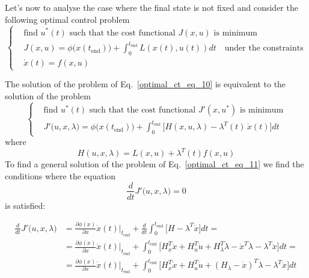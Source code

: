\documentclass[11pt,a4paper,oneside]{book}
\numberwithin{equation}{section}
\theoremstyle{it}
\theoremstyle{definition}
\begin{document}
Let's now to analyse the case where the final state is not fixed and consider 
the following optimal control problem
\begin{equation}\label{optimal_ct_eq_10}
	\left\lbrace \begin{aligned}
		& \text{find $u^*(t)$ such that the cost functional $J(x,u)$ is 
			minimum} \\[8pt]
		& J(x,u) = 
		\phi\big(x(t_{\text{end}})\big)+\int_{0}^{t_{\text{end}}}L(x(t),u(t))dt 
		\quad\text{under the constraints} \\[8pt]
		& \dot{x}(t)=f(x,u) 
	\end{aligned}\right. 
\end{equation}
\begin{mybox}
	The solution of the problem of Eq.~\eqref{optimal_ct_eq_10} is equivalent to 
	the solution of the problem
	\begin{equation}\label{optimal_ct_eq_11}
		\left\lbrace \begin{aligned}
			& \text{find $u^*(t)$ such that the cost functional $J'(x,u^*)$ is 
				minimum} \\[8pt]
			& J'\big(u,x,\lambda\big) = \phi\big(x(t_{\text{end}})\big) + 
			\int_{0}^{t_{\text{end}}}\Bigg[H(x,u,\lambda) - 
			\lambda^T(t)\,\dot{x}(t)\Bigg]dt
		\end{aligned}\right. 
	\end{equation}
	where
	\begin{equation}\label{optimal_ct_eq_12}
		H(u,x,\lambda) = L(x,u)+\lambda^T(t)f(x,u)
	\end{equation} 
	To find a general solution of the problem of Eq.~\eqref{optimal_ct_eq_11} we 
	find the conditions where the equation 
	\begin{equation}\frac{d}{dt}J'\big(u,x,\lambda\big)=0
	\end{equation} {is satisfied}:
\end{mybox}
\begin{equation}\label{optimal_ct_eq_13}
	\begin{aligned}
		\frac{d}{dt}J'\big(u,x,\lambda\big) &= \frac{\partial \phi(x)}{\partial 
			x}\dot{x}(t)\Big|_{t_{\text{end}}} + 
		\frac{d}{dt}\int_{0}^{t_{\text{end}}}\Bigg[H-\lambda^T\dot{x}\Bigg]dt = 
		\\[8pt]
		& = \frac{\partial \phi(x)}{\partial x}\dot{x}(t) \Big|_{t_{\text{end}}}
		+ \int_{0}^{t_{\text{end}}}\Bigg[H_x^T\dot{x} + H_u^T\dot{u} 
		+H_\lambda^T\dot{\lambda} - \dot{x}^T\dot{\lambda} 
		-\lambda^T\ddot{x}\Bigg]dt = \\[8pt]
		& = \frac{\partial \phi(x)}{\partial x}\dot{x}(t) \Big|_{t_{\text{end}}}
		+ \int_{0}^{t_{\text{end}}}\Bigg[H_x^T\dot{x} + H_u^T\dot{u} + 
		(H_\lambda - \dot{x})^T\dot{\lambda}-\lambda^T\ddot{x}\Bigg]dt
	\end{aligned}
\end{equation}
\end{document}
